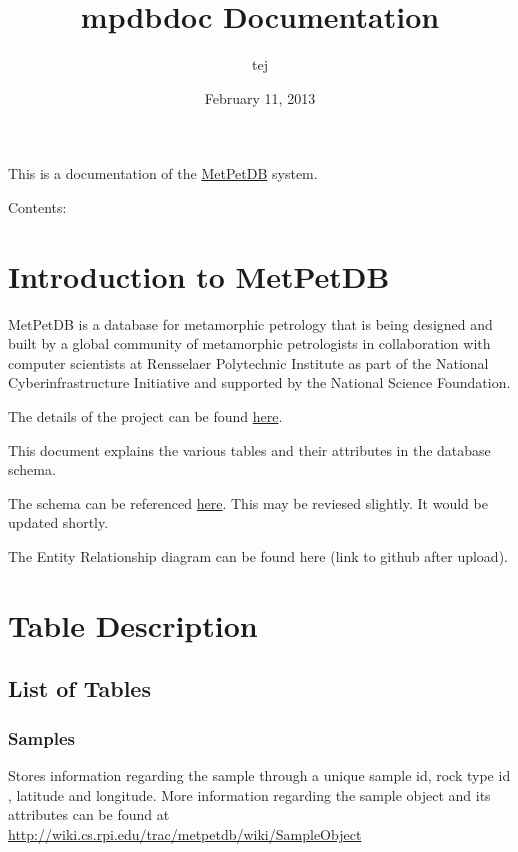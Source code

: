 \documentclass[letterpaper,10pt,english]{sphinxmanual}
\title{mpdbdoc Documentation}
\date{February 11, 2013}
\author{tej}
\begin{document}
\maketitle
\tableofcontents
{}\label{index::doc}


This is a documentation of the \href{http://metpetdb.rpi.edu/metpetweb/\#home}{MetPetDB} system.

Contents:


\chapter{Introduction to MetPetDB}
\label{Introduction:introduction}\label{Introduction:introduction-to-metpetdb}\label{Introduction:welcome-to-metpetdb-s-documentation}\label{Introduction::doc}
MetPetDB is a database for metamorphic petrology that is being designed and built by a global
community of metamorphic petrologists in collaboration with computer scientists at Rensselaer
Polytechnic Institute as part of the National Cyberinfrastructure Initiative and supported by the
National Science Foundation.

The details of the project can be found \href{http://metpetdb.rpi.edu/metpetweb/\#home}{here}.

This document explains the various tables and their attributes in the database schema.

The schema can be referenced \href{https://github.com/metpetdb/metpetdb/tree/master/mpdb-server/schema}{here}. This may be reviesed slightly. It would be updated shortly.

The Entity Relationship diagram can be found here (link to github after upload).


\chapter{Table Description}
\label{Table_Description:table-description}\label{Table_Description::doc}\label{Table_Description:id1}

\section{List of Tables}
\label{Table_Description:list-of-tables}\label{Table_Description:installing-docdir}

\subsection{Samples}
\label{Table_Description:samples}
Stores information regarding the sample through a unique sample id, rock type id , latitude and
longitude. More information regarding the sample object and its attributes can be found at \href{http://wiki.cs.rpi.edu/trac/metpetdb/wiki/SampleObject}{http://wiki.cs.rpi.edu/trac/metpetdb/wiki/SampleObject}
\end{document}

